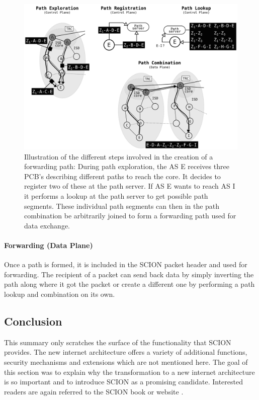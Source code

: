 \begin{figure}
	\begin{center}
		\def\svgwidth{1\textwidth}
		\includegraphics[scale=0.24]{../illustrations/importantConcepts/SCIONPathCreation.pdf} 
		\caption[]{Illustration of the different steps involved in the creation of a forwarding path: During path exploration, the AS E receives three PCB's describing different paths to reach the core. It decides to register two of these at the path server. If AS E wants to reach AS I it performs a lookup at the path server to get possible path segments. These individual path segments can then in the path combination be arbitrarily joined to form a forwarding path used for data exchange.}
		\label{fig:SCIONCreationForwardingPath}
	\end{center}
\end{figure}

\paragraph{Forwarding (Data Plane)}

Once a path is formed, it is included in the SCION packet header and used for forwarding. The recipient of a packet can send back data by simply inverting the path along where it got the packet or create a different one by performing a path lookup and combination on its own.

\subsection*{Conclusion}

This summary only scratches the surface of the functionality that SCION provides. The new internet architecture offers a variety of additional functions, security mechanisms and extensions which are not mentioned here. The goal of this section was to explain why the transformation to a new internet architecture is so important and to introduce SCION as a promising candidate. Interested readers are again referred to the SCION book \cite{SCIONBook} or website \cite{SCIONWebMain}.